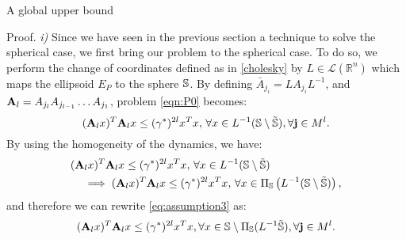 \begin{subsection}{A global upper bound}
\begin{pf*}{Proof.}
\textit{i)} Since we have seen in the previous section a technique to solve the spherical case, we first bring our problem to the spherical case. To do so, we perform the change of coordinates defined as in \eqref{cholesky} by $L \in \mathcal{L}(\mathbb{R}^n)$ which maps the ellipsoid $E_P$ to the sphere $\mathbb{S}$. By defining \mbox{$\bar{A}_{j_i}=  L A_{j_i} L^{-1}$,} and $\mathbf{\relax{A}}_l = \relax{A}_{j_l} \relax{A}_{j_{l-1}} \dots \relax{A}_{j_1} $, problem \eqref{eqn:P0} becomes:
\begin{equation}\label{eq:assumption3}
(\relax{\mathbf{A}}_l x)^T \relax{\mathbf{A}}_l x \leq ({\gamma^*})^{2l} x^T x, \, \forall x \in L^{-1}(\mathbb{S} \setminus \tilde{\mathbb{S}}), \forall \mathbf{j} \in M^l.
\end{equation}
By using the homogeneity of the dynamics, we have:
\begin{equation*}
\begin{aligned}
&(\relax{\mathbf{A}}_l x)^T \relax{\mathbf{A}}_l x \leq ({\gamma^*})^{2l} x^T x,\, \forall x \in L^{-1}(\mathbb{S} \setminus \tilde{\mathbb{S}}) \\ &\quad \implies (\relax{\mathbf{A}}_l x)^T \relax{\mathbf{A}}_l x \leq ({\gamma^*})^{2l} x^T x,\, \forall x \in \Pi_{\mathbb{S}} \left( L^{-1}(\mathbb{S} \setminus \tilde{\mathbb{S}}) \right),
\end{aligned}
\end{equation*}
and therefore we can rewrite \eqref{eq:assumption3} as:
\begin{equation}\label{eq:assumption4}
(\relax{\mathbf{A}}_l x)^T \relax{\mathbf{A}}_l x \leq ({\gamma^*})^{2l} x^T x, \forall x \in \mathbb{S} \setminus \Pi_{\mathbb{S}}(L^{-1}\tilde{\mathbb{S}}), \forall \mathbf{j} \in M^l.
\end{equation}


\end{pf*}
\end{subsection}
